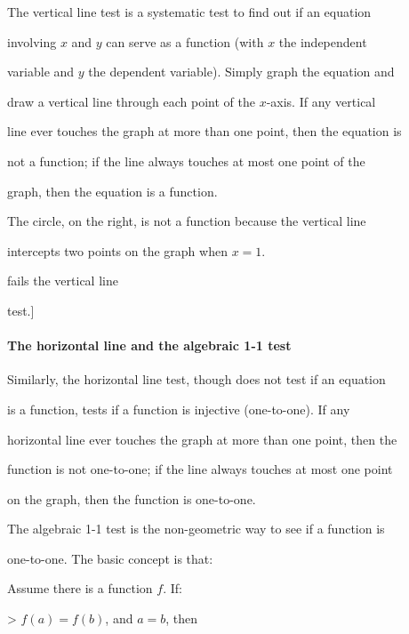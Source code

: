 The vertical line test is a systematic test to find out if an equation

involving $x$ and $y$ can serve as a function (with $x$ the independent

variable and $y$ the dependent variable). Simply graph the equation and

draw a vertical line through each point of the $x$-axis. If any vertical

line ever touches the graph at more than one point, then the equation is

not a function; if the line always touches at most one point of the

graph, then the equation is a function.



The circle, on the right, is not a function because the vertical line

intercepts two points on the graph when $x=1$.




fails the vertical line

test.]



\paragraph{The horizontal line and the algebraic 1-1 test}



Similarly, the horizontal line test, though does not test if an equation

is a function, tests if a function is injective (one-to-one). If any

horizontal line ever touches the graph at more than one point, then the

function is not one-to-one; if the line always touches at most one point

on the graph, then the function is one-to-one.



The algebraic 1-1 test is the non-geometric way to see if a function is

one-to-one. The basic concept is that:



Assume there is a function $f$. If:



> $f(a)=f(b)$, and $a=b$, then



